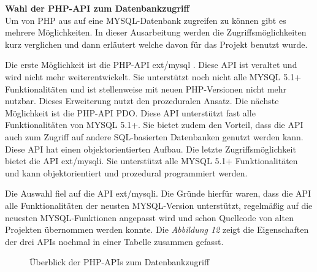 \textbf{Wahl der PHP-API zum Datenbankzugriff}\\
Um von PHP aus auf eine MYSQL-Datenbank zugreifen zu können gibt es mehrere Möglichkeiten. In dieser Ausarbeitung werden die Zugriffsmöglichkeiten kurz verglichen und dann erläutert welche davon für das Projekt benutzt wurde.

Die erste Möglichkeit ist die PHP-API \glqq ext/mysql \grqq{}. Diese API ist veraltet und wird nicht mehr weiterentwickelt. Sie unterstützt noch nicht alle MYSQL 5.1+ Funktionalitäten und ist stellenweise mit neuen PHP-Versionen nicht mehr nutzbar. Dieses Erweiterung nutzt den prozeduralen Ansatz. Die nächste Möglichkeit ist die PHP-API \glqq PDO\grqq{}. Diese API unterstützt fast alle Funktionalitäten von MYSQL 5.1+. Sie bietet zudem den Vorteil, dass die API auch zum Zugriff auf andere SQL-basierten Datenbanken genutzt werden kann. Diese API hat einen objektorientierten Aufbau.  Die letzte Zugriffsmöglichkeit bietet die API \glqq ext/mysqli\grqq{}. Sie unterstützt alle MYSQL 5.1+ Funktionalitäten und kann objektorientiert und prozedural programmiert werden.

Die Auswahl fiel auf die API \glqq ext/mysqli\grqq{}. Die Gründe hierfür waren, dass die API alle Funktionalitäten der neusten MYSQL-Version unterstützt, regelmäßig auf die neuesten MYSQL-Funktionen angepasst wird und schon Quellcode von alten Projekten übernommen werden konnte. Die \textit{Abbildung 12} zeigt die Eigenschaften der drei APIs nochmal in einer Tabelle zusammen gefasst.
\begin{figure}[H]
	\begin{center}
	\end{center}
	\caption{Überblick der PHP-APIs zum Datenbankzugriff}
	\label{fig:Abbildung 12}
\end{figure}


